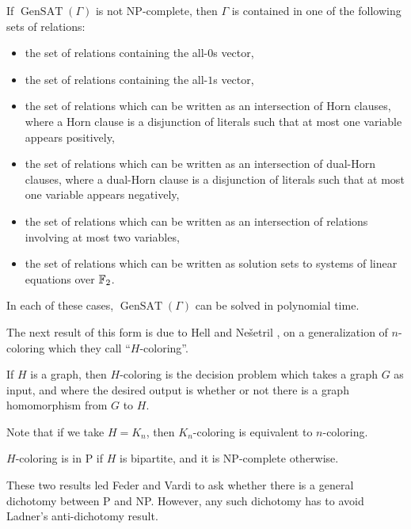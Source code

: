 \documentclass[letterpaper,11pt]{article}
\DeclareMathOperator{\GenSAT}{GenSAT}
\begin{document}
\begin{thm} If $\GenSAT(\Gamma)$ is not NP-complete, then $\Gamma$ is contained in one of the following sets of relations:
\begin{itemize}
\item the set of relations containing the all-$0$s vector,

\item the set of relations containing the all-$1$s vector,

\item the set of relations which can be written as an intersection of Horn clauses, where a Horn clause is a disjunction of literals such that at most one variable appears positively,

\item the set of relations which can be written as an intersection of dual-Horn clauses, where a dual-Horn clause is a disjunction of literals such that at most one variable appears negatively,

\item the set of relations which can be written as an intersection of relations involving at most two variables,

\item the set of relations which can be written as solution sets to systems of linear equations over $\mathbb{F}_2$.
\end{itemize}
In each of these cases, $\GenSAT(\Gamma)$ can be solved in polynomial time.
\end{thm}

The next result of this form is due to Hell and Ne\v{s}etril \cite{h-coloring}, on a generalization of $n$-coloring which they call ``$H$-coloring''.

\begin{defn} If $H$ is a graph, then $H$-coloring is the decision problem which takes a graph $G$ as input, and where the desired output is whether or not there is a graph homomorphism from $G$ to $H$.
\end{defn}

Note that if we take $H = K_n$, then $K_n$-coloring is equivalent to $n$-coloring.

\begin{thm} $H$-coloring is in P if $H$ is bipartite, and it is NP-complete otherwise.
\end{thm}

These two results led Feder and Vardi \cite{feder-vardi} to ask whether there is a general dichotomy between P and NP. However, any such dichotomy has to avoid Ladner's \cite{ladner} anti-dichotomy result.
\end{document}
